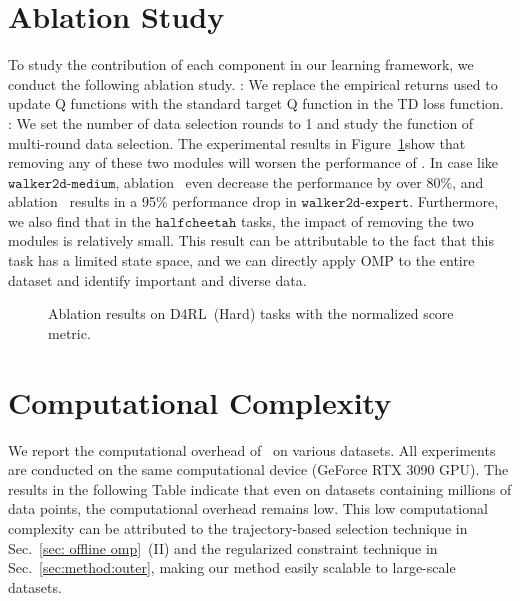 \clearpage
\section{Ablation Study}
\label{sec: ablation}
To study the contribution of each component in our learning framework, we conduct the following ablation study. 
\nameq: We replace the empirical returns used to update Q functions with the standard target Q function in the TD loss function. 
\namei: We set the number of data selection rounds to 1 and study the function of multi-round data selection.
The experimental results in Figure~\ref{fig: modular ablation}show that removing any of these two modules will worsen the performance of \name. In case like $\texttt{walker2d-medium}$, ablation \namei~even decrease the performance by over 80\%, and ablation \nameq~results in a 95\% performance drop in $\texttt{walker2d-expert}$. Furthermore, we also find that in the $\texttt{halfcheetah}$ tasks, the impact of removing the two modules is relatively small. This result can be attributable to the fact that this task has a limited state space, and we can directly apply OMP to the entire dataset and identify important and diverse data.

\begin{figure}[H]
    \centering
    \hspace{0.3cm}
    \caption{Ablation results on D4RL~(Hard) tasks with the normalized score metric.}
    \label{fig: modular ablation}
\end{figure}


\section{Computational Complexity}
\label{appendix: computation complexity}
We report the computational overhead of \name~on various datasets. 
All experiments are conducted on the same computational device (GeForce RTX 3090 GPU). 
The results in the following Table indicate that even on datasets containing millions of data points, the computational overhead remains low. 
This low computational complexity can be attributed to the trajectory-based selection technique in Sec.~\ref{sec: offline omp}~(II) and the regularized constraint technique in Sec.~\ref{sec:method:outer}, making our method easily scalable to large-scale datasets. 


